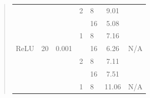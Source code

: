 \documentclass{article}
\begin{document}
\begin{quote}
\begin{table}[h!]
\begin{tabular}{|c|c|c|c|l|c|c|}
			&                       &                                                            & 2                                                       & 8                                                                              & 9.01                                                 &                                                         \\ \cline{5-6}
			\multicolumn{1}{|l|}{}                                           & \multicolumn{1}{l|}{} & \multicolumn{1}{l|}{}                                      & \multicolumn{1}{l|}{}                                   & 16                                                                             & 5.08                                                 &                                                         \\ \hline
			&                       &                                                            & 1                                                       & 8                                                                              & 7.16                                                 & \multirow{3}{*}{N/A}                                    \\ \cline{5-6}
			ReLU                                                             & 20                    & 0.001                                                      &                                                         & 16                                                                             & 6.26                                                 &                                                         \\ \cline{4-6}
			&                       &                                                            & 2                                                       & 8                                                                              & 7.11                                                 &                                                         \\ \cline{5-6}
			\multicolumn{1}{|l|}{}                                           & \multicolumn{1}{l|}{} & \multicolumn{1}{l|}{}                                      & \multicolumn{1}{l|}{}                                   & 16                                                                             & 7.51                                                 &                                                         \\ \hline
			&                       &                                                            & 1                                                       & 8                                                                              & 11.06                                                & \multirow{3}{*}{N/A}                                    \\ \cline{5-6}

\end{tabular}
\end{table}
\end{quote}
\end{document}
